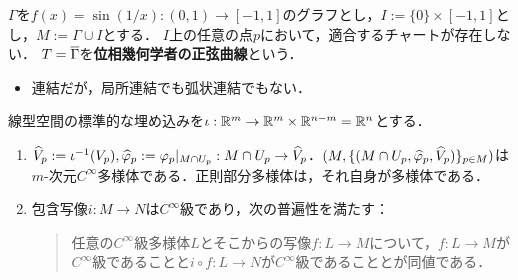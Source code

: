 \documentclass[uplatex,dvipdfmx]{jsreport}
\begin{document}
\begin{example}
    $\Gamma$を$f(x)=\sin(1/x):(0,1)\to[-1,1]$のグラフとし，$I:=\{0\}\times[-1,1]$とし，$M:=\Gamma\cup I$とする．
    $I$上の任意の点$p$において，適合するチャートが存在しない．
    $T=\overline{\Gamma}$を\textbf{位相幾何学者の正弦曲線}という．
    \begin{itemize}
        \item 連結だが，局所連結でも弧状連結でもない．
    \end{itemize}
\end{example}

\begin{lemma}
    線型空間の標準的な埋め込みを$\iota:\mathbb{R}^m\to\mathbb{R}^m\times\mathbb{R}^{n-m}=\mathbb{R}^n$とする．
    \begin{enumerate}
        \item $\widehat{V}_p:=\iota^{-1}(V_p),\widehat{\varphi}_p:=\varphi_p|_{M\cap U_p}:M\cap U_p\to\widehat{V}_p$．$(M,\{(M\cap U_p,\widehat{\varphi}_p,\widehat{V}_p)\}_{p\in M})$は$m$-次元$C^\infty$多様体である．正則部分多様体は，それ自身が多様体である．
        \item 包含写像$i:M\to N$は$C^\infty$級であり，次の普遍性を満たす：
        \begin{quote}
            任意の$C^\infty$級多様体$L$とそこからの写像$f:L\to M$について，$f:L\to M$が$C^\infty$級であることと$i\circ f:L\to N$が$C^\infty$級であることとが同値である．
        \end{quote}
    \end{enumerate}
\end{lemma}
\end{document}
